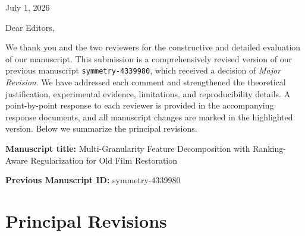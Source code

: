 \documentclass[11pt]{article}
\begin{document}
\begin{flushright}
July 1, 2026
\end{flushright}

Dear Editors,

We thank you and the two reviewers for the constructive and detailed evaluation of our manuscript. This submission is a comprehensively revised version of our previous manuscript \texttt{symmetry-4339980}, which received a decision of \emph{Major Revision}. We have addressed each comment and strengthened the theoretical justification, experimental evidence, limitations, and reproducibility details. A point-by-point response to each reviewer is provided in the accompanying response documents, and all manuscript changes are marked in the highlighted version. Below we summarize the principal revisions.

\textbf{Manuscript title:} Multi-Granularity Feature Decomposition with Ranking-Aware Regularization for Old Film Restoration

\textbf{Previous Manuscript ID:} symmetry-4339980

\section*{Principal Revisions}
\end{document}
